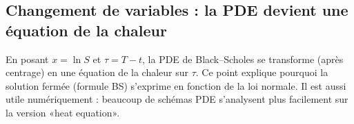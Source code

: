 \documentclass[11pt,a4paper]{report}
\theoremstyle{definition}
\theoremstyle{plain}
\theoremstyle{remark}
\newcommand{\1}{\mathbf{1}}
\newcommand{\codeid}[1]{\texttt{\detokenize{#1}}}
\begin{document}
\subsection*{Changement de variables : la PDE devient une équation de la chaleur}
En posant $x=\ln S$ et $\tau=T-t$, la PDE de Black--Scholes se transforme (après centrage) en une équation de la chaleur sur $\tau$.
Ce point explique pourquoi la solution fermée (formule BS) s'exprime en fonction de la loi normale.
Il est aussi utile numériquement : beaucoup de schémas PDE s'analysent plus facilement sur la version «heat equation».

\end{document}
